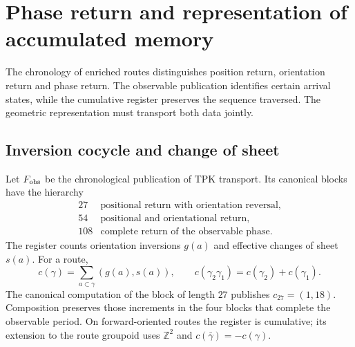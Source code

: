 
\section{Phase return and representation of accumulated memory}
\label{vii:vii:sec:retorno-memoria-gravedad}

The chronology of enriched routes distinguishes position return,
orientation return and phase return. The observable publication
identifies certain arrival states, while the cumulative register
preserves the sequence traversed. The geometric representation must
transport both data jointly.

\subsection{Inversion cocycle and change of sheet}
\label{vii:vii:subsec:cociclo-memoria}

Let \(F_{\rm obs}\) be the chronological publication of TPK transport.
Its canonical blocks have the hierarchy
\[
\begin{array}{c|l}
27&\text{positional return with orientation reversal},\\
54&\text{positional and orientational return},\\
108&\text{complete return of the observable phase}.
\end{array}
\]
The register counts orientation inversions \(g(a)\) and
effective changes of sheet \(s(a)\). For a route,
\begin{equation}
 c(\gamma)=\sum_{a\subset\gamma}(g(a),s(a)),\qquad
 c(\gamma_2\gamma_1)=c(\gamma_2)+c(\gamma_1).
 \label{vii:vii:eq:cociclo-ruta}
\end{equation}
The canonical computation of the block of length \(27\) publishes
\(c_{27}=(1,18)\). Composition preserves those increments in
the four blocks that complete the observable period.
On forward-oriented routes the register is cumulative;
its extension to the route groupoid uses \(\mathbb Z^2\) and
\(c(\bar\gamma)=-c(\gamma)\).

